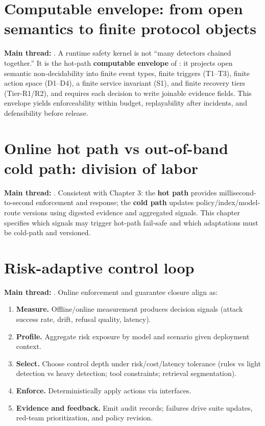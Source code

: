 \documentclass[11pt,a4paper]{report}
\begin{document}
\section{Computable envelope: from open semantics to finite protocol objects}
\textbf{Main thread:} \DecoupledSafety{}. A runtime safety kernel is not “many detectors chained together.” It is the hot-path \textbf{computable envelope} of \DecoupledSafety{}: it projects open semantic non-decidability into finite event types, finite triggers (T1--T3), finite action space (D1--D4), a finite service invariant (S1), and finite recovery tiers (Tier-R1/R2), and requires each decision to write joinable evidence fields. This envelope yields enforceability within budget, replayability after incidents, and defensibility before release.

\section{Online hot path vs out-of-band cold path: division of labor}
\textbf{Main thread:} \ControlPlane{}. Consistent with Chapter 3: the \textbf{hot path} provides millisecond-to-second enforcement and response; the \textbf{cold path} updates policy/index/model-route versions using digested evidence and aggregated signals. This chapter specifies which signals may trigger hot-path fail-safe and which adaptations must be cold-path and versioned.

\section{Risk-adaptive control loop}
\textbf{Main thread:} \ControlPlane{}. Online enforcement and guarantee closure align as:
\begin{enumerate}
  \item \textbf{Measure.} Offline/online measurement produces decision signals (attack success rate, drift, refusal quality, latency).
  \item \textbf{Profile.} Aggregate risk exposure by model and scenario given deployment context.
  \item \textbf{Select.} Choose control depth under risk/cost/latency tolerance (rules vs light detection vs heavy detection; tool constraints; retrieval segmentation).
  \item \textbf{Enforce.} Deterministically apply actions via \SafetyKernel{} interfaces.
  \item \textbf{Evidence and feedback.} Emit audit records; failures drive suite updates, red-team prioritization, and policy revision.
\end{enumerate}
\end{document}

